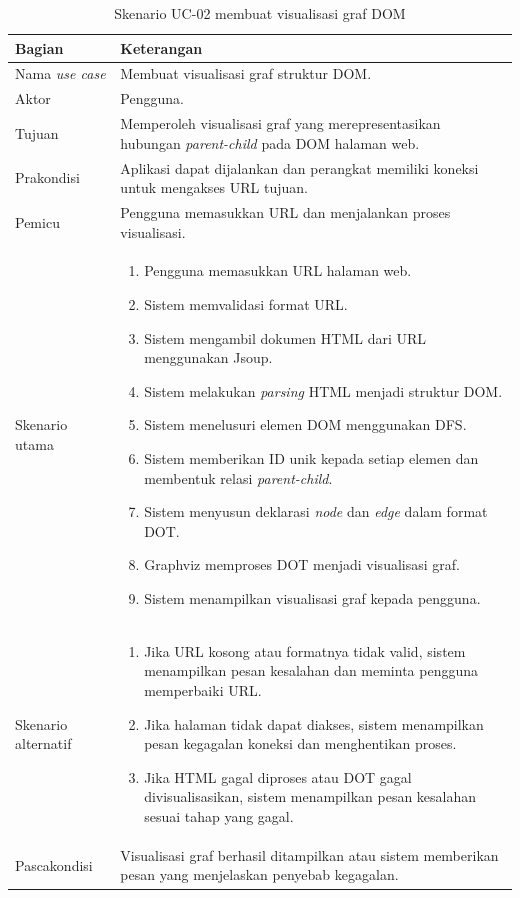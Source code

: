 \begin{longtable}{|p{}|p{}|}
    \caption{Skenario UC-02 membuat visualisasi graf DOM}\label{tab:skenario-uc02-dom} \\
    \hline
    \textbf{Bagian} & \textbf{Keterangan} \\ \hline
    Nama \textit{use case} & Membuat visualisasi graf struktur DOM. \\ \hline
    Aktor & Pengguna. \\ \hline
    Tujuan & Memperoleh visualisasi graf yang merepresentasikan hubungan \textit{parent-child} pada DOM halaman web. \\ \hline
    Prakondisi & Aplikasi dapat dijalankan dan perangkat memiliki koneksi untuk mengakses URL tujuan. \\ \hline
    Pemicu & Pengguna memasukkan URL dan menjalankan proses visualisasi. \\ \hline
    Skenario utama &
    \begin{enumerate}[leftmargin=*, itemsep=0pt, topsep=0pt]
        \item Pengguna memasukkan URL halaman web.
        \item Sistem memvalidasi format URL.
        \item Sistem mengambil dokumen HTML dari URL menggunakan Jsoup.
        \item Sistem melakukan \textit{parsing} HTML menjadi struktur DOM.
        \item Sistem menelusuri elemen DOM menggunakan DFS.
        \item Sistem memberikan ID unik kepada setiap elemen dan membentuk relasi \textit{parent-child}.
        \item Sistem menyusun deklarasi \textit{node} dan \textit{edge} dalam format DOT.
        \item Graphviz memproses DOT menjadi visualisasi graf.
        \item Sistem menampilkan visualisasi graf kepada pengguna.
    \end{enumerate} \\ \hline
    Skenario alternatif &
    \begin{enumerate}[label=\alph*., leftmargin=*, itemsep=0pt, topsep=0pt]
        \item Jika URL kosong atau formatnya tidak valid, sistem menampilkan pesan kesalahan dan meminta pengguna memperbaiki URL.
        \item Jika halaman tidak dapat diakses, sistem menampilkan pesan kegagalan koneksi dan menghentikan proses.
        \item Jika HTML gagal diproses atau DOT gagal divisualisasikan, sistem menampilkan pesan kesalahan sesuai tahap yang gagal.
    \end{enumerate} \\ \hline
    Pascakondisi & Visualisasi graf berhasil ditampilkan atau sistem memberikan pesan yang menjelaskan penyebab kegagalan. \\ \hline
\end{longtable}

